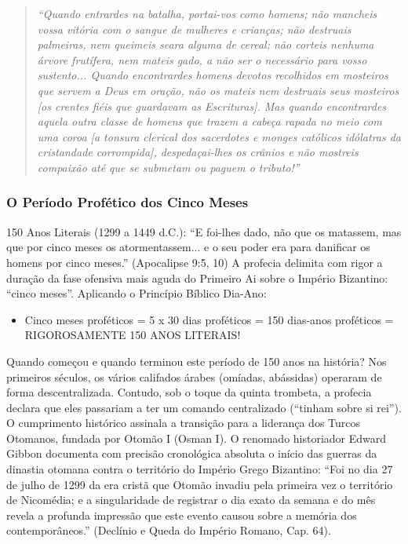 \begin{quote}
\itshape ``Quando entrardes na batalha, portai-vos como homens; não mancheis vossa vitória com o sangue de mulheres e crianças; não destruais palmeiras, nem queimeis seara alguma de cereal; não corteis nenhuma árvore frutífera, nem mateis gado, a não ser o necessário para vosso sustento... Quando encontrardes homens devotos recolhidos em mosteiros que servem a Deus em oração, não os mateis nem destruais seus mosteiros [os crentes fiéis que guardavam as Escrituras]. Mas quando encontrardes aquela outra classe de homens que trazem a cabeça rapada no meio com uma coroa [a tonsura clerical dos sacerdotes e monges católicos idólatras da cristandade corrompida], despedaçai-lhes os crânios e não mostreis compaixão até que se submetam ou paguem o tributo!''
\end{quote}



\subsubsection*{O Período Profético dos Cinco Meses}
150 Anos Literais (1299 a 1449 d.C.):
``E foi-lhes dado, não que os matassem, mas que por cinco meses os atormentassem... e o seu poder era para danificar os homens por cinco meses.'' (Apocalipse 9:5, 10)
A profecia delimita com rigor a duração da fase ofensiva mais aguda do Primeiro Ai sobre o Império Bizantino: ``cinco meses''.
Aplicando o Princípio Bíblico Dia-Ano:
\begin{itemize}
  \item Cinco meses proféticos = 5 x 30 dias proféticos = 150 dias-anos proféticos = RIGOROSAMENTE 150 ANOS LITERAIS!
\end{itemize}


Quando começou e quando terminou este período de 150 anos na história?
Nos primeiros séculos, os vários califados árabes (omíadas, abássidas) operaram de forma descentralizada. Contudo, sob o toque da quinta trombeta, a profecia declara que eles passariam a ter um comando centralizado (``tinham sobre si rei'').
O cumprimento histórico assinala a transição para a liderança dos Turcos Otomanos, fundada por Otomão I (Osman I).
O renomado historiador Edward Gibbon documenta com precisão cronológica absoluta o início das guerras da dinastia otomana contra o território do Império Grego Bizantino:
``Foi no dia 27 de julho de 1299 da era cristã que Otomão invadiu pela primeira vez o território de Nicomédia; e a singularidade de registrar o dia exato da semana e do mês revela a profunda impressão que este evento causou sobre a memória dos contemporâneos.'' (Declínio e Queda do Império Romano, Cap. 64).

